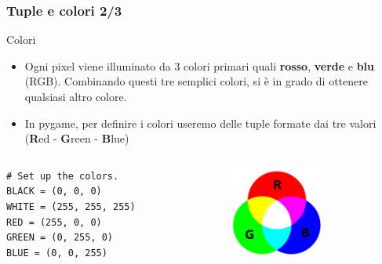 \documentclass{beamer}
\begin{document}
\begin{frame}[fragile]
\frametitle{Tuple e colori 2/3}
\begin{block}{Colori}
	\begin{itemize}
		\item Ogni pixel viene illuminato da 3 colori primari quali \textbf{rosso}, \textbf{verde} e \textbf{blu} (RGB). Combinando questi tre semplici colori, si è in grado di ottenere qualsiasi altro colore.
		\item In pygame, per definire i colori useremo delle tuple formate dai tre valori (\textbf{R}ed - \textbf{G}reen - \textbf{B}lue)
	\end{itemize}
\end{block}
\begin{columns}[T]
	\begin{column}[T]{0.55\textwidth}
		\begin{lstlisting}
# Set up the colors.
BLACK = (0, 0, 0)
WHITE = (255, 255, 255)
RED = (255, 0, 0)
GREEN = (0, 255, 0)
BLUE = (0, 0, 255)
		\end{lstlisting}
	\end{column}
	\begin{column}[T]{0.45\textwidth}
		\begin{figure}[t]
			\includegraphics[height=3cm, width=3cm]{images/RGB.png}
		\end{figure}
	\end{column}
\end{columns}
\end{frame}
\end{document}
